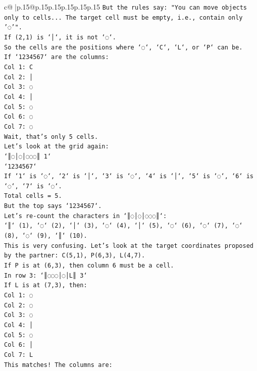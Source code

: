 \documentclass{article}
\begin{document}
{\begin{supertabular}{c@{$\;$}|p{.15\linewidth}@{}p{.15\linewidth}p{.15\linewidth}p{.15\linewidth}p{.15\linewidth}p{.15\linewidth}}
{{{\texttt{But the rules say: "You can move objects only to cells... The target cell must be empty, i.e., contain only '◌'".} \\
\texttt{If (2,1) is `│`, it is not `◌`.} \\
\texttt{So the cells are the positions where `◌`, `C`, `L`, or `P` can be.} \\
\texttt{If `1234567` are the columns:} \\
\texttt{Col 1: C} \\
\texttt{Col 2: │} \\
\texttt{Col 3: ◌} \\
\texttt{Col 4: │} \\
\texttt{Col 5: ◌} \\
\texttt{Col 6: ◌} \\
\texttt{Col 7: ◌} \\
\texttt{Wait, that's only 5 cells.} \\
\texttt{Let's look at the grid again:} \\
\texttt{`║◌│◌│◌◌◌║ 1`} \\
\texttt{`1234567`} \\
\texttt{If `1` is `◌`, `2` is `│`, `3` is `◌`, `4` is `│`, `5` is `◌`, `6` is `◌`, `7` is `◌`.} \\
\texttt{Total cells = 5.} \\
\texttt{But the top says `1234567`.} \\
\texttt{Let's re{-}count the characters in `║◌│◌│◌◌◌║`:} \\
\texttt{`║` (1), `◌` (2), `│` (3), `◌` (4), `│` (5), `◌` (6), `◌` (7), `◌` (8), `◌` (9), `║` (10).} \\
\texttt{This is very confusing. Let's look at the target coordinates proposed by the partner: C(5,1), P(6,3), L(4,7).} \\
\texttt{If P is at (6,3), then column 6 must be a cell.} \\
\texttt{In row 3: `║◌◌◌│◌│L║ 3`} \\
\texttt{If L is at (7,3), then:} \\
\texttt{Col 1: ◌} \\
\texttt{Col 2: ◌} \\
\texttt{Col 3: ◌} \\
\texttt{Col 4: │} \\
\texttt{Col 5: ◌} \\
\texttt{Col 6: │} \\
\texttt{Col 7: L} \\
\texttt{This matches! The columns are:} \\
}}}
\end{supertabular}}
\end{document}
